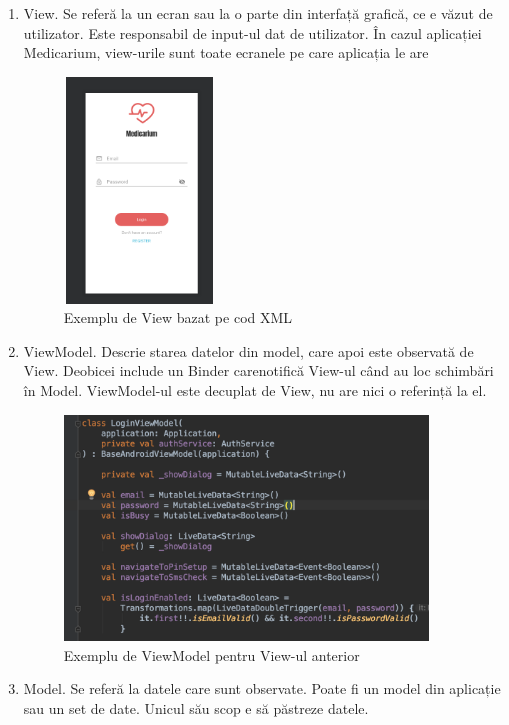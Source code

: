 \documentclass[12pt]{article}
\begin{document}
\begin{enumerate}
    \item View. Se referă la un ecran sau la o parte din interfață grafică,
    ce e văzut de utilizator. Este responsabil de input-ul dat de utilizator. În cazul aplicației
    Medicarium, view-urile sunt toate ecranele pe care aplicația le are

    \begin{figure}[H]
    \centering
    \includegraphics[width=4cm, height=6cm]{view.png}
    \caption{Exemplu de View bazat pe cod XML}
    \end{figure}

    \item ViewModel. Descrie starea datelor din model, care apoi este observată de
    View. Deobicei include un Binder carenotifică View-ul când au loc schimbări în Model.
    ViewModel-ul este decuplat de View, nu are nici o referință la el.

    \begin{figure}[H]
    \centering
    \includegraphics[height=6cm]{viewModel.png}
    \caption{Exemplu de ViewModel pentru View-ul anterior}
    \end{figure}
    
    \item Model. Se referă la datele care sunt observate. Poate
    fi un model din aplicație sau un set de date. Unicul său scop
    e să păstreze datele.



\end{enumerate}
\end{document}

